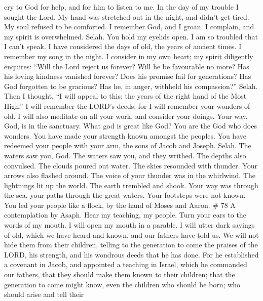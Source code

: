 cry to God for help, and for him to listen to me.  In the
day of my trouble I sought the Lord. My hand was stretched out in the
night, and didn't get tired. My soul refused to be comforted.
 I remember God, and I groan. I complain, and my spirit is
overwhelmed. Selah.  You hold my eyelids open. I am so
troubled that I can't speak.  I have considered the days of
old, the years of ancient times.  I remember my song in the
night. I consider in my own heart; my spirit diligently enquires:
 ``Will the Lord reject us forever? Will he be favourable no
more?  Has his loving kindness vanished forever? Does his
promise fail for generations?  Has God forgotten to be
gracious? Has he, in anger, withheld his compassion?'' Selah.
 Then I thought, ``I will appeal to this: the years of the
right hand of the Most High.''  I will remember the LORD's
deeds; for I will remember your wonders of old.  I will
also meditate on all your work, and consider your doings. 
Your way, God, is in the sanctuary. What god is great like God?
 You are the God who does wonders. You have made your
strength known amongst the peoples.  You have redeemed your
people with your arm, the sons of Jacob and Joseph. Selah. 
The waters saw you, God. The waters saw you, and they writhed. The
depths also convulsed.  The clouds poured out water. The
skies resounded with thunder. Your arrows also flashed around.
 The voice of your thunder was in the whirlwind. The
lightnings lit up the world. The earth trembled and shook. 
Your way was through the sea, your paths through the great waters. Your
footsteps were not known.  You led your people like a
flock, by the hand of Moses and Aaron. \# 78 A contemplation by Asaph.
 Hear my teaching, my people. Turn your ears to the words of
my mouth.  I will open my mouth in a parable. I will utter
dark sayings of old,  which we have heard and known, and our
fathers have told us.  We will not hide them from their
children, telling to the generation to come the praises of the LORD, his
strength, and his wondrous deeds that he has done.  For he
established a covenant in Jacob, and appointed a teaching in Israel,
which he commanded our fathers, that they should make them known to
their children;  that the generation to come might know,
even the children who should be born; who should arise and tell their
